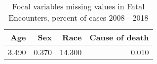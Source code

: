 \begin{table}[ht]
\centering
\begin{tabular}{rrrr}
  \hline
Age & Sex & Race & Cause of death \\ 
  \hline
3.490 & 0.370 & 14.300 & 0.010 \\ 
   \hline
\end{tabular}
\caption{Focal variables missing values in Fatal Encounters, percent of cases 2008 - 2018} 
\label{tab:pct_var}
\end{table}
